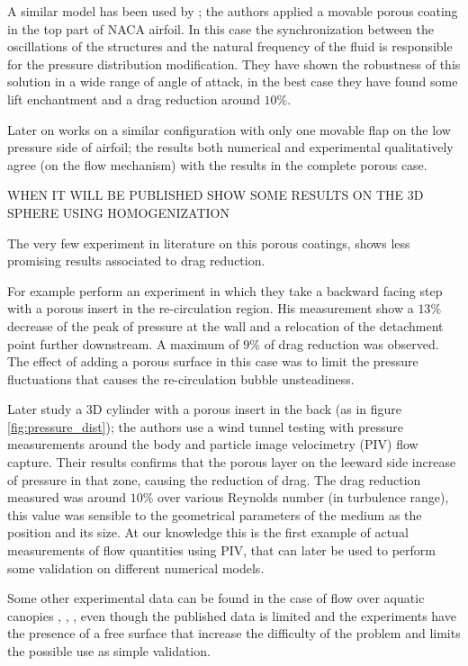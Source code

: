 A similar model has been used by \citet{venkataraman2012numerical}; the authors applied a movable porous coating in the top part of NACA airfoil.
In this case the synchronization between the oscillations of the structures and the natural frequency of the fluid is responsible for the pressure distribution modification.
They have shown the robustness of this solution in a wide range of angle of attack, in the best case they have found some lift enchantment and a drag reduction around $10\%$.

Later on \citet{rosti2017pelskin} works on a similar configuration with only one movable flap on the low pressure side of airfoil; the results both numerical and experimental qualitatively agree (on the flow mechanism) with the results in the complete porous case.

WHEN IT WILL BE PUBLISHED SHOW SOME RESULTS ON THE 3D SPHERE USING HOMOGENIZATION \citet{zampogna2017new}

The very few experiment in literature on this porous coatings, shows less promising results associated to drag reduction.

For example \citet{heenan1998passive} perform an experiment in which they take a backward facing step with a porous insert in the re-circulation region.
His measurement show a $13\%$ decrease of the peak of pressure at the wall and a relocation of the detachment point further downstream.
A maximum of $9\%$ of drag reduction was observed.
The effect of adding a porous surface in this case was to limit the pressure fluctuations that causes the re-circulation bubble unsteadiness.

Later \citet{klausmann2017drag} study a 3D cylinder with a porous insert in the back (as in figure \ref{fig:pressure_dist}); the authors use a wind tunnel testing with pressure measurements around the body and particle image velocimetry (PIV) flow capture.
Their results confirms that the porous layer on the leeward side increase of pressure in that zone, causing the reduction of drag.
The drag reduction measured was around $10\%$ over various Reynolds number (in turbulence range), this value was sensible to the geometrical parameters of the medium as the position and its size.
At our knowledge this is the first example of actual measurements of flow quantities using PIV, that can later be used to perform some validation on different numerical models.

Some other experimental data can be found in the case of flow over aquatic canopies \citet{zhang2011exchange}, \citet{segalini2011experimental}, \citet{hamed2017impact}, even though the published data is limited and the experiments have the presence of a free surface that increase the difficulty of the problem and limits the possible use as simple validation.

